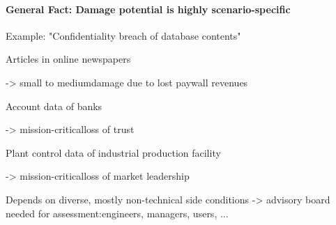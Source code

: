 \documentclass[a4paper]{article}
\begin{document}
\begin{multicols}{3}
    \paragraph{General Fact: Damage potential is highly scenario-specific}
    Example: "Confidentiality breach of database contents"
    \begin{itemize*}
        \item Articles in online newspapers
              \begin{itemize*}
                  \item -> small to mediumdamage due to lost paywall revenues
              \end{itemize*}
        \item Account data of banks
              \begin{itemize*}
                  \item -> mission-criticalloss of trust
              \end{itemize*}
        \item Plant control data of industrial production facility
              \begin{itemize*}
                  \item -> mission-criticalloss of market leadership
              \end{itemize*}
    \end{itemize*}

    Depends on diverse, mostly non-technical side conditions ->  advisory board needed for assessment:engineers, managers, users, ...


\end{multicols}
\end{document}
